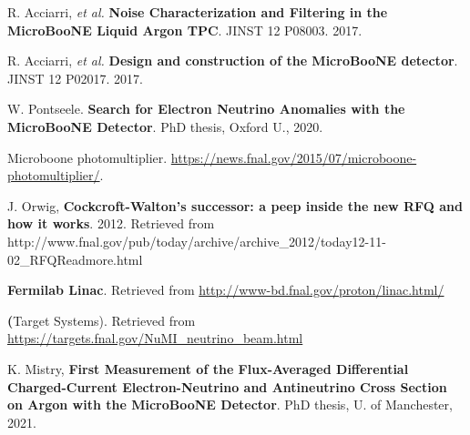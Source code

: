  R. Acciarri, \textit{et al.} \textbf{Noise Characterization and Filtering in the MicroBooNE Liquid Argon TPC}. JINST 12 P08003. 2017.

 R. Acciarri, \textit{et al.} \textbf{Design and construction of the MicroBooNE detector}. JINST 12 P02017. 2017. 

 W. Pontseele. \textbf{Search for Electron Neutrino Anomalies with the MicroBooNE Detector}. PhD thesis, Oxford U., 2020.

 Microboone photomultiplier. \href{https://news.fnal.gov/2015/07/microboone- photomultiplier/}{https://news.fnal.gov/2015/07/microboone- photomultiplier/}.

 J. Orwig, \textbf{Cockcroft-Walton's successor: a peep inside the new RFQ and how it works}. 2012. Retrieved from http://www.fnal.gov/pub/today/archive/archive\_2012/today12-11-02\_RFQReadmore.html

 \textbf{Fermilab Linac}. Retrieved from \url{http://www-bd.fnal.gov/proton/linac.html/}

 \textbf(Target Systems). Retrieved from \url{https://targets.fnal.gov/NuMI_neutrino_beam.html}

 K. Mistry, \textbf{First Measurement of the Flux-Averaged Differential Charged-Current Electron-Neutrino and Antineutrino Cross Section on Argon with the MicroBooNE Detector}. PhD thesis, U. of Manchester, 2021. 